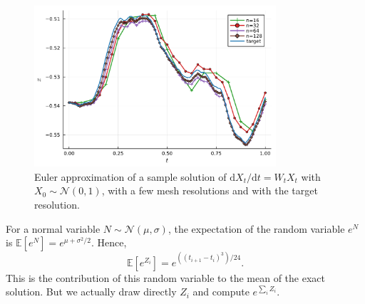 \documentclass[reqno,12pt]{amsart}
\theoremstyle{plain} %
\theoremstyle{definition} %
\begin{document}
\begin{figure}
    \centerline{\includegraphics[width=0.8\textwidth]{img/approximation_linearhomogenous.pdf}}
    \caption{Euler approximation of a sample solution of $\mathrm{d}X_t/\mathrm{d}t = W_t X_t$ with $X_0 \sim \mathcal{N}(0, 1)$, with a few mesh resolutions and with the target resolution.}
    \label{samplepathslinearhomogeneousrode}
\end{figure}

For a normal variable $N \sim \mathcal{N}(\mu, \sigma)$, the expectation of the random variable $e^N$ is $\mathbb{E}[e^N] = e^{\mu + \sigma^2/2}$. Hence,
\begin{equation}
    \label{Xtlinearhomogeneousrodeestimateexponentialofnomral}
    \mathbb{E}[e^{Z_i}] = e^{((t_{i+1}- t_i)^3)/24}.
\end{equation}
This is the contribution of this random variable to the mean of the exact solution. But we actually draw directly $Z_i$ and compute $e^{\sum_i Z_i}$.
\end{document}
